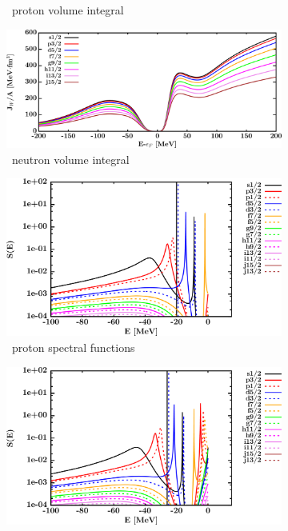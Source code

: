 \begin{figure}[hbtp]
\begin{subfigure}[b]{0.45\textwidth}
        \caption{\caForty\ proton volume integral}
        \label{DOMFitData_ca40_proton_potentialIntegral}
    \end{subfigure}\hspace{6pt}
    \begin{subfigure}[b]{0.45\textwidth}
        \centering
        \includegraphics[width=\linewidth]{figures/ca40_neutronVolumeIntegrals.png}
        \caption{\caForty\ neutron volume integral}
        \label{DOMFitData_ca40_neutron_potentialIntegral}
    \end{subfigure}\vspace{0.3in}
    \begin{subfigure}[b]{0.45\textwidth}
        \centering
        \includegraphics[width=\linewidth]{figures/ca40_protonSpectralFunctions.png}
        \caption{\caForty\ proton spectral functions}
        \label{DOMFitData_ca40_proton_spectralFunctions}
    \end{subfigure}\hspace{6pt}
    \begin{subfigure}[b]{0.45\textwidth}
        \centering
        \includegraphics[width=\linewidth]{figures/ca40_neutronSpectralFunctions.png}

\end{subfigure}
\end{figure}
